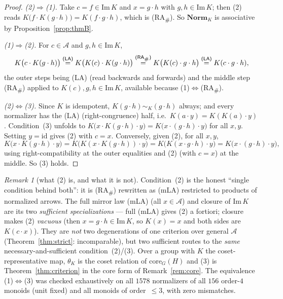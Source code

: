 \documentclass[11pt]{amsart}
\theoremstyle{plain}
\theoremstyle{definition}
\theoremstyle{remark}
\newtheorem{remark}[theorem]{Remark}
\newcommand{\Norm}{\mathbf{Norm}}
\newcommand{\Img}{\mathrm{Im}\,}
\newcommand{\id}{\mathrm{id}}
\newcommand{\LA}{\textsf{(LA)}}
\newcommand{\mLA}{\textsf{(mLA)}}
\newcommand{\RA}{\textsf{(RA}\textsubscript{\#}\textsf{)}}
\newcommand{\simK}{\mathrel{\sim_{K}}}
\begin{document}
\begin{proof}
\emph{(2)$\Rightarrow$(1).} Take $c=f\in\Img K$ and $x=g\cdot h$ with $g,h\in\Img K$; then (2) reads
$K\big(f\cdot K(g\cdot h)\big)=K(f\cdot g\cdot h)$, which is \RA{}. So $\Norm_K$ is associative by
Proposition~\ref{prop:thmB}.

\emph{(1)$\Rightarrow$(2).} For $c\in\mathcal{A}$ and $g,h\in\Img K$,
\[
  K\big(c\cdot K(g\cdot h)\big)
  \overset{\LA{}}{=}K\big(K(c)\cdot K(g\cdot h)\big)
  \overset{\RA{}}{=}K\big(K(c)\cdot g\cdot h\big)
  \overset{\LA{}}{=}K(c\cdot g\cdot h),
\]
the outer steps being \LA{} (read backwards and forwards) and the middle step \RA{} applied to
$K(c),g,h\in\Img K$, available because (1)$\Leftrightarrow$\RA{}.

\emph{(2)$\Leftrightarrow$(3).} Since $K$ is idempotent, $K(g\cdot h)\simK(g\cdot h)$ always; and every
normalizer has the \LA{} (right-congruence) half, i.e.\ $K(a\cdot y)=K(K(a)\cdot y)$. Condition~(3)
unfolds to $K\big(x\cdot K(g\cdot h)\cdot y\big)=K\big(x\cdot(g\cdot h)\cdot y\big)$ for all $x,y$.
Setting $y=\id$ gives (2) with $c=x$. Conversely, given (2), for all $x,y$,
\[
  K\big(x\cdot K(g\cdot h)\cdot y\big)=K\big(K(x\cdot K(g\cdot h))\cdot y\big)
  =K\big(K(x\cdot g\cdot h)\cdot y\big)=K\big(x\cdot(g\cdot h)\cdot y\big),
\]
using right-compatibility at the outer equalities and (2) (with $c=x$) at the middle. So (3) holds.
\end{proof}

\begin{remark}[what (2) is, and what it is not]
\label{rem:tfae-ends}
Condition~(2) is the honest ``single condition behind both'': it is \RA{} rewritten as \mLA{}
restricted to products of normalized arrows. The full mirror law \mLA{} (all $x\in\mathcal{A}$) and
closure of $\Img K$ are its two \emph{sufficient specializations} --- full \mLA{} gives (2) a
fortiori; closure makes (2) \emph{vacuous} (then $x=g\cdot h\in\Img K$, so $K(x)=x$ and both sides are
$K(c\cdot x)$). They are \emph{not} two degenerations of one criterion over general $\mathcal{A}$
(Theorem~\ref{thm:strict}: incomparable), but two sufficient routes to the \emph{same}
necessary-and-sufficient condition~(2)/(3). Over a group with $K$ the coset-representative map,
$\theta_K$ is the coset relation of $\mathrm{core}_G(H)$ and (3) is Theorem~\ref{thm:criterion} in the
core form of Remark~\ref{rem:core}. The equivalence (1)$\Leftrightarrow$(3) was checked exhaustively
on all $1578$ normalizers of all $156$ order-$4$ monoids (unit fixed) and all monoids of order~$\le3$,
with zero mismatches.
\end{remark}
\end{document}
